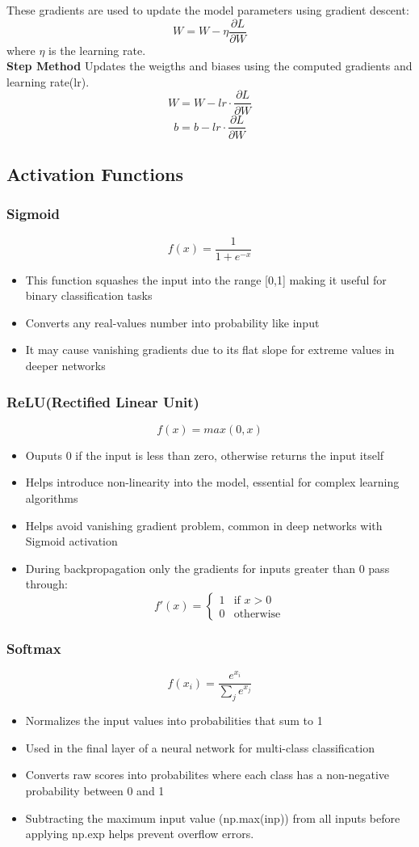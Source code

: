 \documentclass{article}
\begin{document}
These gradients are used to update the model parameters using gradient descent:
\[
W = W - \eta \frac{\partial L}{\partial W}
\]
where \( \eta \) is the learning rate.
\vspace{.2cm}
\\ \textbf{Step Method}
Updates the weigths and biases using the computed gradients and learning rate(lr).
\[
W = W - lr \cdot \frac{\partial L}{\partial W}
\]
\[
b = b - lr \cdot \frac{\partial L}{\partial W}
\]
\subsection*{Activation Functions}
\subsubsection*{Sigmoid}
\[
f(x) = \frac{1}{1 + e^{-x}}
\]
\begin{itemize}
  \item This function squashes the input into the range [0,1] making it useful for binary classification tasks
  \item Converts any real-values number into probability like input
  \item It may cause vanishing gradients due to its flat slope for extreme values in deeper networks
\end{itemize}
\subsubsection*{ReLU(Rectified Linear Unit)}
\[
f(x) = max(0,x)
\]
\begin{itemize}
  \item Ouputs 0 if the input is less than zero, otherwise returns the input itself
  \item Helps introduce non-linearity into the model, essential for complex learning algorithms
  \item Helps avoid vanishing gradient problem, common in deep networks with Sigmoid activation
  \item During backpropagation only the gradients for inputs greater than 0 pass through:
  \[
  f'(x) = 
  \begin{cases}
    1 & \text{if } x > 0 \\
    0 & \text{otherwise}
  \end{cases}
  \]
\end{itemize}
\subsubsection*{Softmax}
\[
f(x_i) = \frac{e^{x_i}}{\sum_{j} e^{x_j}}
\]
\begin{itemize}
  \item Normalizes the input values into probabilities that sum to 1
  \item Used in the final layer of a neural network for multi-class classification
  \item Converts raw scores into probabilites where each class has a non-negative probability between 0 and 1
  \item Subtracting the maximum input value (np.max(inp)) from all inputs before applying np.exp helps prevent overflow errors.
\end{itemize}
\end{document}
